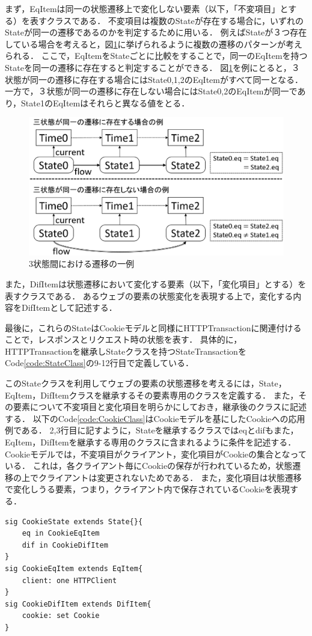 \documentclass[12pt,a4paper]{jbook}
\begin{document}
まず，EqItemは同一の状態遷移上で変化しない要素（以下，「不変項目」とする）を表すクラスである．
不変項目は複数のStateが存在する場合に，いずれのStateが同一の遷移であるのかを判定するために用いる．
例えばStateが３つ存在している場合を考えると，図\ref{fig:ProposedModel-3StateFlow}に挙げられるように複数の遷移のパターンが考えられる．
ここで，EqItemをStateごとに比較をすることで，同一のEqItemを持つStateを同一の遷移に存在すると判定することができる．
図\ref{fig:ProposedModel-3StateFlow}を例にとると，３状態が同一の遷移に存在する場合にはState0,1,2のEqItemがすべて同一となる．
一方で，３状態が同一の遷移に存在しない場合にはState0,2のEqItemが同一であり，State1のEqItemはそれらと異なる値をとる．

\begin{figure}[htb]
\centering
\includegraphics[width=400pt]{./fig/ProposedModel-3StateFlow.eps}
\caption{3状態間における遷移の一例}
\label{fig:ProposedModel-3StateFlow}
\end{figure}

また，DifItemは状態遷移において変化する要素（以下，「変化項目」とする）を表すクラスである．
あるウェブの要素の状態変化を表現する上で，変化する内容をDifItemとして記述する．

最後に，これらのStateはCookieモデルと同様にHTTPTransactionに関連付けることで，レスポンスとリクエスト時の状態を表す．
具体的に，HTTPTransactionを継承しStateクラスを持つStateTransactionをCode\ref{code:StateClass}の9-12行目で定義している．

このStateクラスを利用してウェブの要素の状態遷移を考えるには，State，EqItem，DifItemクラスを継承するその要素専用のクラスを定義する．
また，その要素について不変項目と変化項目を明らかにしておき，継承後のクラスに記述する．
以下のCode\ref{code:CookieClass}はCookieモデルを基にしたCookieへの応用例である．
2,3行目に記すように，Stateを継承するクラスではeqとdifもまた，EqItem，DifItemを継承する専用のクラスに含まれるように条件を記述する．
Cookieモデルでは，不変項目がクライアント，変化項目がCookieの集合となっている．
これは，各クライアント毎にCookieの保存が行われているため，状態遷移の上でクライアントは変更されないためである．
また，変化項目は状態遷移で変化しうる要素，つまり，クライアント内で保存されているCookieを表現する．
\begin{lstlisting}[caption=Cookieへの応用例, label=code:CookieClass]
sig CookieState extends State{}{
	eq in CookieEqItem
	dif in CookieDifItem
}
sig CookieEqItem extends EqItem{
	client: one HTTPClient
}
sig CookieDifItem extends DifItem{
	cookie: set Cookie
}
\end{lstlisting}
\end{document}
